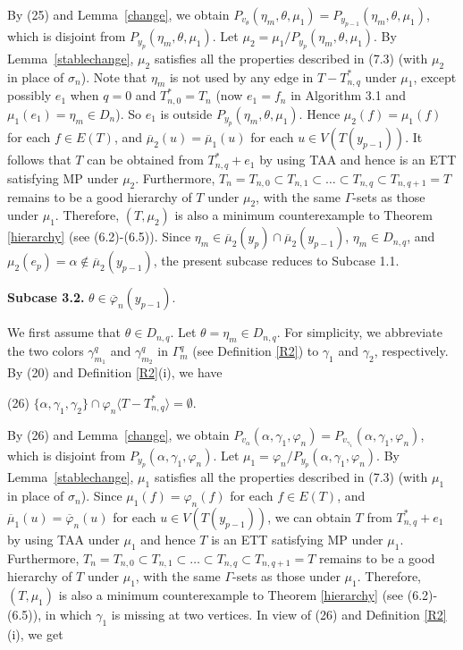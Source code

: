 \documentclass[11pt]{article}
\begin{document}
By (25) and  Lemma~\ref{change}, we obtain $P_{v_{\theta}} (\eta_m, \theta, \mu_1) = P_{y_{p-1}}(\eta_m, \theta, 
\mu_1)$, which is disjoint from $P_{y_p}(\eta_m, \theta, \mu_1)$. Let $\mu_2=\mu_1/P_{y_{p}}(\eta_m,\theta, 
\mu_1)$. By Lemma~\ref{stablechange},  $\mu_2$ satisfies all the properties described in (7.3) (with $\mu_2$ in 
place of $\sigma_n$). Note that $\eta_m$ is not used by any edge in $T -  T_{n,q}^*$ under $\mu_1$, except possibly 
$e_1$ when $q=0$ and $T_{n,0}^*=T_n$ (now $e_1=f_n$ in Algorithm 3.1 and $\mu_1(e_1)=\eta_m \in D_n$). So
$e_1$ is outside $P_{y_p}(\eta_m, \theta, \mu_1)$. Hence 
$\mu_2(f)=\mu_1(f)$ for each $f\in E(T)$, and $\overline{\mu}_2(u)= \overline{\mu}_1(u)$ for each $u\in V(T(y_{p-1}))$.
It follows that $T$ can be obtained from $T_{n,q}^*+e_1$ by using TAA and hence is an ETT satisfying MP under $\mu_2$. Furthermore, 
$T_n=T_{n,0} \subset T_{n,1} \subset \ldots \subset T_{n,q} \subset T_{n,q+1}=T$ remains to be a good hierarchy of $T$ under $\mu_2$, with the same $\Gamma$-sets as those under $\mu_1$. Therefore, $(T, \mu_2)$ is also a minimum counterexample to Theorem \ref{hierarchy} (see (6.2)-(6.5)). Since $\eta_m \in \overline{\mu}_2(y_p) \cap \overline{\mu}_2(y_{p-1})$, $\eta_m\in D_{n,q}$, and $\mu_2(e_p)=\alpha \notin \overline{\mu}_2(y_{p-1})$, the present subcase reduces to Subcase 1.1.

{\bf Subcase 3.2.} $\theta \in\overline{\varphi}_n(y_{p-1})$.

We first assume that $\theta \in D_{n,q}$. Let $\theta=\eta_{m}\in D_{n,q}$. For simplicity, we abbreviate the 
two colors $\gamma^{q}_{m_1}$ and $\gamma^{q}_{m_2}$ in $\Gamma^{q}_m$ (see Definition \ref{R2}) to $\gamma_1$ and 
$\gamma_2$, respectively. By (20) and Definition \ref{R2}(i), we have

(26) $\{\alpha, \gamma_1, \gamma_2\}\cap \varphi_n \langle T - T_{n,q}^* \rangle=\emptyset$.

By (26) and  Lemma~\ref{change}, we obtain $P_{v_{\alpha}} (\alpha, \gamma_1, \varphi_n) = P_{v_{\gamma_1}}(\alpha, \gamma_1, \varphi_n)$, which is disjoint from $P_{y_p}(\alpha, \gamma_1, \varphi_n)$. Let $\mu_1=\varphi_n/P_{y_{p}}(\alpha, \gamma_1, 
\varphi_n)$. By Lemma~\ref{stablechange},  $\mu_1$ satisfies all the properties described in (7.3) (with $\mu_1$ in 
place of $\sigma_n$). Since $\mu_1(f)=\varphi_n(f)$ for each $f\in E(T)$, and $\overline{\mu}_1(u)= 
\overline{\varphi}_n(u)$ for each $u\in V(T(y_{p-1}))$, we can obtain $T$ from $T_{n,q}^*+e_1$ by using TAA under 
$\mu_1$ and hence $T$ is an ETT satisfying MP under $\mu_1$. Furthermore, $T_n=T_{n,0} \subset T_{n,1} \subset \ldots \subset 
T_{n,q} \subset T_{n,q+1}=T$ remains to be a good hierarchy of $T$ under $\mu_1$, with the same $\Gamma$-sets as those under $\mu_1$. Therefore, $(T, \mu_1)$ is also a minimum counterexample to Theorem \ref{hierarchy} (see (6.2)-(6.5)),
in which $\gamma_1$ is missing at two vertices. In view of (26) and Definition \ref{R2}(i), we get
\end{document}
